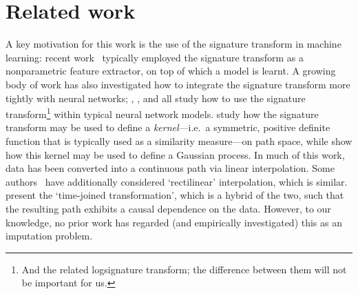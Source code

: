 \documentclass{article}
\begin{document}
\section{Related work} %

A key motivation for this work is the use of the signature transform in
machine learning: recent work~\citep{primer2016,
kormilitzlin2016, yang2016rotation, li2017lpsnet, yang2017leveraging,
PerezArribas2018, morrill2019sepsis} typically employed the signature transform as a nonparametric feature extractor, on top of which
a model is learnt. A growing body of work has also investigated how to
integrate the signature transform more tightly with neural networks; 
\citet{jeremythesis}, \citet{logsigrnn}, and \citet{kidger2019deep} all
study how to use the signature transform\footnote{And the related
logsignature transform; the difference between them will not be
important for us.} within typical neural network models.
\citet{chevyrev2018signature, kiraly2019kernels} study how the signature
transform may be used to define a \emph{kernel}---i.e.\ a symmetric,
positive definite function that is typically used as a similarity
measure---on path space, while \citet{toth2019gp} show how this kernel
may be used to define a Gaussian process.
%
In much of this work, data has been converted into a continuous path via
linear interpolation. Some authors~\citep{primer2016,
fermanian2019embedding} have additionally considered `rectilinear'
interpolation, which is similar. \citet{levin2013} present the
`time-joined transformation', which is a hybrid of the two, such that
the resulting path exhibits a causal dependence on the data.  However,
to our knowledge, no prior work has regarded (and empirically investigated) this as an imputation
problem.
\end{document}
